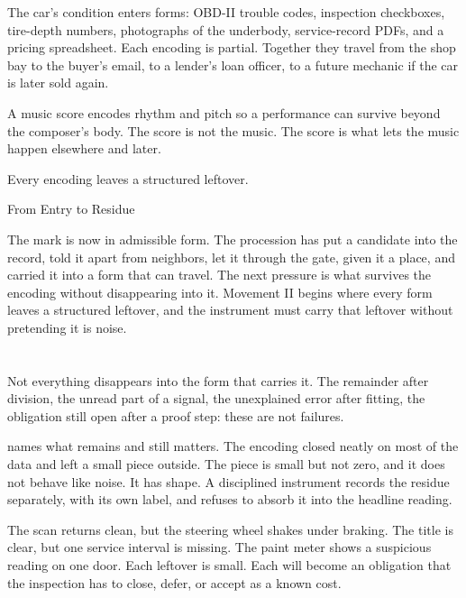 The car's condition enters forms: OBD-II trouble codes, inspection
checkboxes, tire-depth numbers, photographs of the underbody, service-record
PDFs, and a pricing spreadsheet. Each encoding is partial. Together they
travel from the shop bay to the buyer's email, to a lender's loan officer,
to a future mechanic if the car is later sold again.

A music score encodes rhythm and pitch so a performance can survive beyond
the composer's body. The score is not the music. The score is what lets the
music happen elsewhere and later.

Every encoding leaves a structured leftover.

\begin{movement}{From Entry to Residue}

The mark is now in admissible form. The procession has put a candidate into
the record, told it apart from neighbors, let it through the gate, given it
a place, and carried it into a form that can travel. The next pressure is
what survives the encoding without disappearing into it. Movement II begins
where every form leaves a structured leftover, and the instrument must
carry that leftover without pretending it is noise.

\end{movement}

\section{}
\label{se:residue}

Not everything disappears into the form that carries it. The remainder
after division, the unread part of a signal, the unexplained error after
fitting, the obligation still open after a proof step: these are not
failures.

 names what remains and still matters. The encoding closed
neatly on most of the data and left a small piece outside. The piece is
small but not zero, and it does not behave like noise. It has shape. A
disciplined instrument records the residue separately, with its own label,
and refuses to absorb it into the headline reading.

The scan returns clean, but the steering wheel shakes under braking. The
title is clear, but one service interval is missing. The paint meter shows
a suspicious reading on one door. Each leftover is small. Each will become
an obligation that the inspection has to close, defer, or accept as a known
cost.

